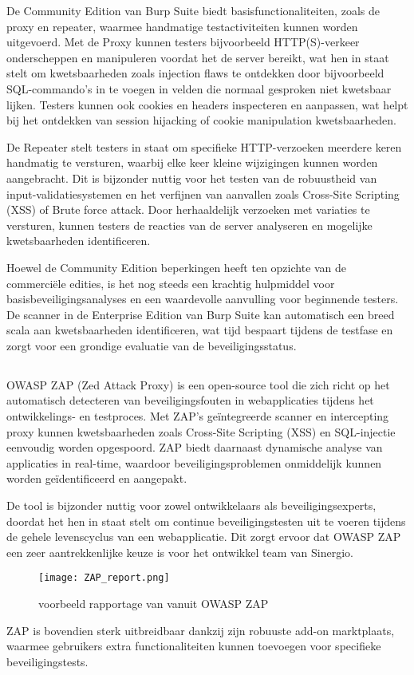 De Community Edition van Burp Suite biedt basisfunctionaliteiten, zoals de proxy en repeater, 
waarmee handmatige testactiviteiten kunnen worden uitgevoerd. Met de Proxy kunnen testers bijvoorbeeld HTTP(S)-verkeer 
onderscheppen en manipuleren voordat het de server bereikt, wat hen in staat stelt om kwetsbaarheden zoals injection flaws 
te ontdekken door bijvoorbeeld SQL-commando's in te voegen in velden die normaal gesproken niet kwetsbaar lijken. Testers 
kunnen ook cookies en headers inspecteren en aanpassen, wat helpt bij het ontdekken van session hijacking of cookie 
manipulation kwetsbaarheden.

De Repeater stelt testers in staat om specifieke HTTP-verzoeken meerdere keren handmatig te versturen, waarbij elke keer 
kleine wijzigingen kunnen worden aangebracht. Dit is bijzonder nuttig voor het testen van de robuustheid van 
input-validatiesystemen en het verfijnen van aanvallen zoals Cross-Site Scripting (XSS) of Brute force attack. Door 
herhaaldelijk verzoeken met variaties te versturen, kunnen testers de reacties van de server analyseren en mogelijke 
kwetsbaarheden identificeren.

Hoewel de Community Edition beperkingen heeft ten opzichte van de 
commerciële edities, is het nog steeds een krachtig hulpmiddel voor basisbeveiligingsanalyses en een waardevolle aanvulling 
voor beginnende testers. De scanner in de Enterprise Edition van Burp Suite kan automatisch een breed scala aan kwetsbaarheden 
identificeren, wat tijd bespaart tijdens de testfase en zorgt voor een grondige evaluatie van de beveiligingsstatus.

\subsection{}
OWASP ZAP (Zed Attack Proxy) is een open-source tool die zich richt op het automatisch detecteren van beveiligingsfouten in 
webapplicaties tijdens het ontwikkelings- en testproces. Met ZAP's geïntegreerde scanner en intercepting proxy kunnen 
kwetsbaarheden zoals Cross-Site Scripting (XSS) en SQL-injectie eenvoudig worden opgespoord. ZAP biedt 
daarnaast dynamische analyse van applicaties in real-time, waardoor beveiligingsproblemen onmiddelijk kunnen worden geïdentificeerd 
en aangepakt.

De tool is bijzonder nuttig voor zowel ontwikkelaars als beveiligingsexperts, doordat het hen in staat stelt 
om continue beveiligingstesten uit te voeren tijdens de gehele levenscyclus van een webapplicatie. Dit zorgt ervoor dat 
OWASP ZAP een zeer aantrekkenlijke keuze is voor het ontwikkel team van Sinergio.
\begin{figure}
    \centering
    \texttt{[image: ZAP\_report.png]}
    \caption[voorbeeld rapportage van vanuit OWASP ZAP]{voorbeeld rapportage van vanuit OWASP ZAP}
    \label{fig:zap_report}
\end{figure}
ZAP is bovendien sterk uitbreidbaar dankzij zijn robuuste add-on marktplaats, waarmee gebruikers extra functionaliteiten 
kunnen toevoegen voor specifieke beveiligingstests. 

